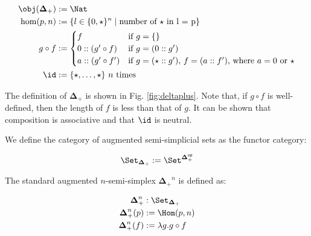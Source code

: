 \documentclass[10pt]{art.cls/art}
\newcommand{\DeltaPlus}{\ensuremath{\boldsymbol{\Delta}_+}}
\newcommand{\kstar}{{\star}}
\begin{document}
\begin{definition}[$\DeltaPlus$]
  \begin{figure*}[!t]
    \begin{align*}
      \obj(\DeltaPlus) & := \Nat                                                                     \\
      \hom(p, n)       & := \{l \in \{0, \kstar\}^n \mid \text{number of $\kstar$ in l = p}\}        \\
      g \circ f        & :=
      \begin{cases}
        f                  & \text{if $g = \{\}$}                                                      \\
        0 :: (g' \circ f)  & \text{if $g = (0 :: g')$}                                                 \\
        a :: (g' \circ f') & \text{if $g = (\star :: g')$, $f = (a :: f')$, where $a = 0$ or $\kstar$} \\
      \end{cases} \\
      \id              & := \{\kstar, \ldots, \kstar\} \text{ $n$ times}
    \end{align*}
    \caption{Definition of \DeltaPlus}\label{fig:deltaplus}
  \end{figure*}

  The definition of $\DeltaPlus$ is shown in Fig. \ref{fig:deltaplus}. Note that, if $g \circ f$ is well-defined, then the length of $f$ is less than that of $g$. It can be shown that composition is associative and that $\id$ is neutral.
\end{definition}

\begin{definition}[$\Set_{\DeltaPlus}$]
  We define the category of augmented semi-simplicial sets as the functor category:

  \begin{equation*}
    \Set_{\DeltaPlus} := \Set^{\DeltaPlus^{\mathsf{op}}}
  \end{equation*}
\end{definition}

\begin{definition}[$\DeltaPlus^n$]
  The standard augmented $n$-semi-simplex $\DeltaPlus^n$ is defined as:

  \begin{align*}
    \DeltaPlus^n    & : \Set_{\DeltaPlus}      \\
    \DeltaPlus^n(p) & := \Hom(p, n)            \\
    \DeltaPlus^n(f) & := \lambda g . g \circ f
  \end{align*}
\end{definition}
\end{document}
